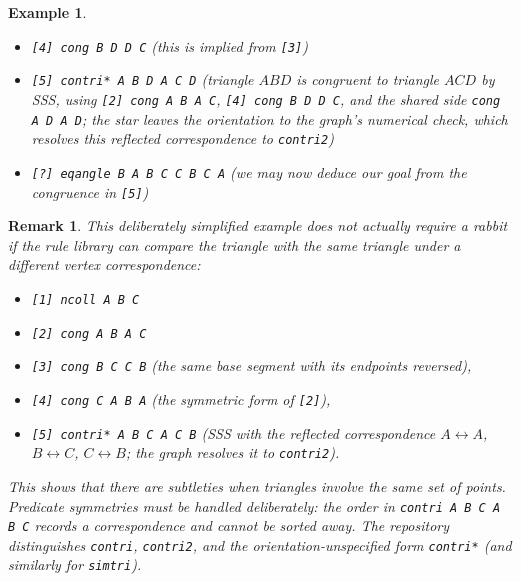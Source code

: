 \documentclass[reqno]{amsart}
\DeclareMathOperator{\1}{\textbf{1}}
\newtheorem{example}[thm]{Example}
\newtheorem{remark}[thm]{Remark}
\begin{document}
\begin{example}
\begin{itemize}
        \item \verb|[4] cong B D D C| (this is implied from \verb|[3]|)
        \item \verb|[5] contri* A B D A C D| (triangle $ABD$ is congruent to triangle $ACD$ by SSS, using \verb|[2] cong A B A C|, \verb|[4] cong B D D C|, and the shared side \verb|cong A D A D|; the star leaves the orientation to the graph's numerical check, which resolves this reflected correspondence to \verb|contri2|)
        \item \verb|[?] eqangle B A B C C B C A| (we may now deduce our goal from the congruence in \verb|[5]|)
    \end{itemize}
\end{example}

\begin{remark}
    This deliberately simplified example does not actually require a rabbit
    if the rule library can compare the triangle with the same triangle under
    a different vertex correspondence:
    \begin{itemize}
        \item \verb|[1] ncoll A B C|
        \item \verb|[2] cong A B A C|
        \item \verb|[3] cong B C C B| (the same base segment with its endpoints reversed),
        \item \verb|[4] cong C A B A| (the symmetric form of \verb|[2]|),
        \item \verb|[5] contri* A B C A C B| (SSS with the reflected correspondence $A\leftrightarrow A$, $B\leftrightarrow C$, $C\leftrightarrow B$; the graph resolves it to \verb|contri2|).
        \end{itemize}
    This shows that there are subtleties when triangles involve the same set
    of points. Predicate symmetries must be handled deliberately: the order in
    \verb|contri A B C A B C| records a correspondence and cannot be sorted
    away.  The repository distinguishes \verb|contri|, \verb|contri2|, and
    the orientation-unspecified form \verb|contri*| (and similarly for
    \verb|simtri|).
\end{remark}
\end{document}
